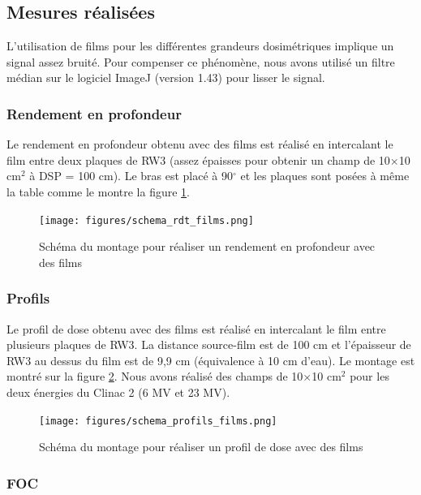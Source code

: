 \documentclass{book}
\begin{document}
\subsection{Mesures réalisées}

L'utilisation de films pour les différentes grandeurs dosimétriques implique un signal assez bruité. Pour compenser ce phénomène, nous avons utilisé un filtre médian sur le logiciel ImageJ (version 1.43) pour lisser le signal.

\subsubsection{Rendement en profondeur}

Le rendement en profondeur obtenu avec des films est réalisé en intercalant le film entre deux plaques de RW3 (assez épaisses pour obtenir un champ de 10$\times$10 cm$^2$ à DSP = 100 cm). Le bras est placé à 90$^{\circ}$ et les plaques sont posées à même la table comme le montre la figure \ref*{fig_schema_rdt_films}.

\begin{figure}[h]
  \centering
  \texttt{[image: figures/schema\_rdt\_films.png]}
  \caption{Schéma du montage pour réaliser un rendement en profondeur avec des films}
  \label{fig_schema_rdt_films}
\end{figure}

\subsubsection{Profils}

Le profil de dose obtenu avec des films est réalisé en intercalant le film entre plusieurs plaques de RW3. La distance source-film est de 100 cm et l'épaisseur de RW3 au dessus du film est de 9,9 cm (équivalence à 10 cm d'eau). Le montage est montré sur la figure \ref*{fig_schema_profils_films}. Nous avons réalisé des champs de 10$\times$10 cm$^2$ pour les deux énergies du Clinac 2 (6 MV et 23 MV).

\begin{figure}[h]
  \centering
  \texttt{[image: figures/schema\_profils\_films.png]}
  \caption{Schéma du montage pour réaliser un profil de dose avec des films}
  \label{fig_schema_profils_films}
\end{figure}

\subsubsection{FOC}
\end{document}
